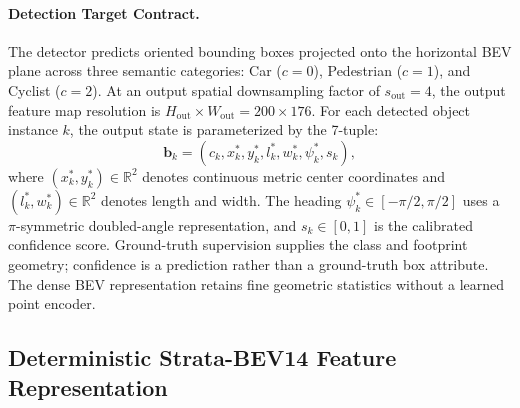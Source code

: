 \paragraph{Detection Target Contract.}
The detector predicts oriented bounding boxes projected onto the horizontal BEV plane across three semantic categories: Car ($c=0$), Pedestrian ($c=1$), and Cyclist ($c=2$). At an output spatial downsampling factor of $s_{\mathrm{out}} = 4$, the output feature map resolution is $H_{\mathrm{out}} \times W_{\mathrm{out}} = 200 \times 176$. For each detected object instance $k$, the output state is parameterized by the 7-tuple:
\begin{equation}
    \mathbf{b}_k = (c_k, x_k^*, y_k^*, l_k^*, w_k^*, \psi_k^*, s_k),
    \label{eq:target_tuple}
\end{equation}
where $(x_k^*, y_k^*) \in \mathbb{R}^2$ denotes continuous metric center coordinates and $(l_k^*, w_k^*) \in \mathbb{R}^2$ denotes length and width. The heading $\psi_k^* \in [-\pi/2, \pi/2]$ uses a $\pi$-symmetric doubled-angle representation, and $s_k \in [0, 1]$ is the calibrated confidence score. Ground-truth supervision supplies the class and footprint geometry; confidence is a prediction rather than a ground-truth box attribute. The dense BEV representation retains fine geometric statistics without a learned point encoder.

\par\vspace{-0.5\baselineskip}
\subsection{Deterministic Strata-BEV14 Feature Representation}
\label{sec:strata_bev14}

